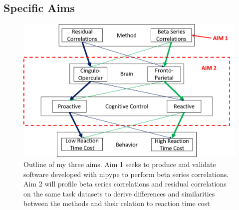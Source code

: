 \documentclass[phd,appendix,figures]{uithesis}
\begin{document}
\begin{itemize}
\section{Specific Aims}
\begin{figure}[H]%
	\centering
	\includegraphics[width=1\linewidth]{overall_thesis_pic}
	\caption{Outline of my three aims. Aim 1 seeks to produce and validate software developed with nipype to perform beta series correlations.
	Aim 2 will profile beta series correlations and residual correlations on the same task datasets to derive differences and similarities between the methods and their relation to reaction time cost}
	\label{fig:all_aims}
\end{figure}


\end{itemize}
\end{document}
